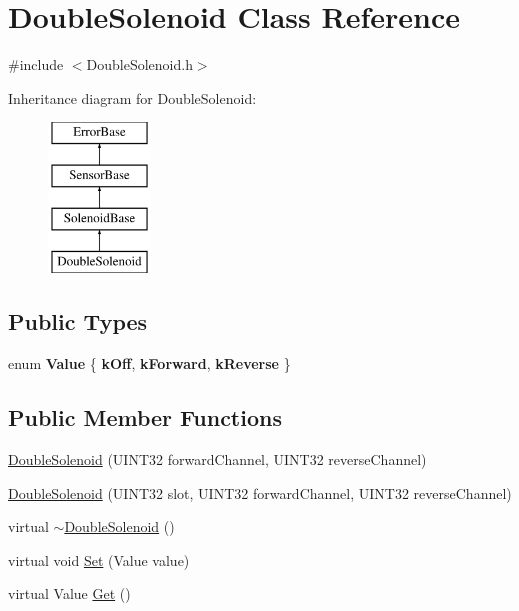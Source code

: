 \hypertarget{classDoubleSolenoid}{\section{\-Double\-Solenoid \-Class \-Reference}
\label{classDoubleSolenoid}
}


{\ttfamily \#include $<$\-Double\-Solenoid.\-h$>$}

\-Inheritance diagram for \-Double\-Solenoid\-:\begin{figure}[H]
\begin{center}
\leavevmode
\includegraphics[height=4.000000cm]{classDoubleSolenoid}
\end{center}
\end{figure}
\subsection*{\-Public \-Types}
\begin{DoxyCompactItemize}
\item 
enum {\bfseries \-Value} \{ {\bfseries k\-Off}, 
{\bfseries k\-Forward}, 
{\bfseries k\-Reverse}
 \}
\end{DoxyCompactItemize}
\subsection*{\-Public \-Member \-Functions}
\begin{DoxyCompactItemize}
\item 
\hyperlink{classDoubleSolenoid_af543be114c3c7ab9df19bcb91917fbe1}{\-Double\-Solenoid} (\-U\-I\-N\-T32 forward\-Channel, \-U\-I\-N\-T32 reverse\-Channel)
\item 
\hyperlink{classDoubleSolenoid_a2bfec5f3b394f1a0fa29a209fc533802}{\-Double\-Solenoid} (\-U\-I\-N\-T32 slot, \-U\-I\-N\-T32 forward\-Channel, \-U\-I\-N\-T32 reverse\-Channel)
\item 
virtual \hyperlink{classDoubleSolenoid_a6bb0815514cc362a87def521fd544508}{$\sim$\-Double\-Solenoid} ()
\item 
virtual void \hyperlink{classDoubleSolenoid_a538ae9e357b7c97e01f213f8fe0a7c20}{\-Set} (\-Value value)
\item 
virtual \-Value \hyperlink{classDoubleSolenoid_a831cbfdb95c2c689bfd6644a01694fe8}{\-Get} ()
\end{DoxyCompactItemize}


